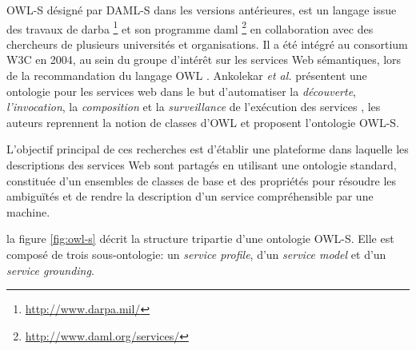     \textsc{OWL-S} \cite{martin2004owl} désigné par \textsc{DAML-S}
    \cite{ankolekar2002daml} dans les versions antérieures, est un
    langage issue des travaux de \acrshort{darba}
    \footnote{\url{http://www.darpa.mil/}} et son programme
    \acrshort{daml} \footnote{\url{http://www.daml.org/services/}} en
    collaboration avec des chercheurs de plusieurs universités et
    organisations. Il a été intégré au consortium \textsc{W3C} en
    2004, au sein du groupe d'intérêt sur les services Web
    sémantiques, lors de la recommandation du langage \textsc{OWL}
    \cite{horrocks2002daml+oil} \cite{mcguinness2004owl}.  Ankolekar
    \emph{et al.}  \cite{ankolekar2002daml} présentent une ontologie
    pour les services web dans le but d'automatiser la
    \emph{découverte}, \emph{l'invocation}, la \emph{composition} et
    la \emph{surveillance} de l'exécution des services
    \cite{mcilraith2003bringing}, les auteurs reprennent la notion de
    classes d'\textsc{OWL} et proposent l'ontologie \textsc{OWL-S}.
    

    L'objectif principal de ces recherches est d'établir une
    plateforme dans laquelle les descriptions des services Web sont
    partagés en utilisant une ontologie standard, constituée d'un
    ensembles de classes de base et des propriétés pour résoudre les
    ambiguïtés et de rendre la description d'un service compréhensible
    par une machine.

    la figure \ref{fig:owl-s} décrit la structure tripartie d'une
    ontologie \textsc{OWL-S}. Elle est composé de trois
    sous-ontologie: un \emph{service profile}, d'un \emph{service
      model} et d'un \emph{service grounding}.

